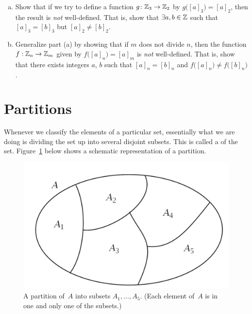 \begin{exercise}
\begin{enumerate}[(a)]
\item  \label{WellDefEx-odd2}
 Show that if we try to define a function $g \colon \mathbb{Z}_3 \to \mathbb{Z}_2$ by $g \bigl( [a]_3 \bigr) = [a]_2$, then the result is \emph{not} well-defined. That is, show that $\exists a, b \in \mathbb{Z}$ such that
$[a]_3 = [b]_3$  but $[a]_2 \neq [b]_2.$
\item
Generalize part (a) by showing that 
if $m$ does not divide $n$, then the function 
$f: \mathbb{Z}_n \to \mathbb{Z}_m$  given by $f \bigl( [a]_n \bigr) = [a]_m$ is \emph{not} well-defined.
That is, show that there exists integers $a$, $b$ such that $[a]_n = [b]_n$ and $f \bigl( [a]_n \bigr) \neq f \bigl( [b]_n \bigr)$.
\end{enumerate}
\end{exercise}


\section{Partitions}  \label{EquivalenceRelationsPartitionsSect}

Whenever we classify the elements of a particular set, essentially what we are doing is dividing the set up into several disjoint subsets. This is called a   of the set. Figure~\ref{partitionfig} below shows a schematic representation of a partition.

\begin{center}
\begin{figure}[ht]
\label{partitionfig}
\includegraphics[scale=0.35]{images/partition.pdf}
\caption{A partition of~$A$ into subsets $A_1, \ldots, A_5$. 
(Each element of~$A$ is in one and only one of the subsets.)}
\end{figure}
\end{center}


